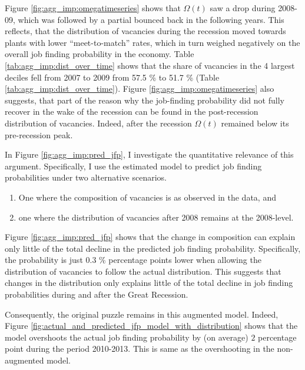 Figure \ref{fig:agg_imp:omegatimeseries} shows that $\Omega(t)$ saw a drop during 2008-09, which was followed by a partial bounced back in the following years. This reflects, that the distribution of vacancies during the recession moved towards plants with lower \enquote{meet-to-match} rates, which in turn weighed negatively on the overall job finding probability in the economy. Table \ref{tab:agg_imp:dist_over_time} shows that the share of vacancies in the 4 largest deciles fell from 2007 to 2009 from 57.5 \% to 51.7 \% (Table \ref{tab:agg_imp:dist_over_time}). Figure \ref{fig:agg_imp:omegatimeseries}  also suggests, that part of the reason why the job-finding probability did not fully recover in the wake of the recession can be found in the post-recession distribution of vacancies. Indeed, after the recession $\Omega(t)$ remained below its pre-recession peak.

In Figure \ref{fig:agg_imp:pred_jfp}, I investigate the quantitative relevance of this argument. Specifically, I use the estimated model to predict job finding probabilities under two alternative scenarios. 
\begin{enumerate}
	\item One where the composition of vacancies is as observed in the data, and
	\item one where the distribution of vacancies after 2008 remains at the 2008-level.
\end{enumerate}

Figure \ref{fig:agg_imp:pred_jfp} shows that the change in composition can explain only little of the total decline in the predicted job finding probability. Specifically, the probability is just 0.3 \% percentage points lower when allowing the distribution of vacancies to follow the actual distribution. This suggests that changes in the distribution only explains little of the total decline in job finding probabilities during and after the Great Recession. 

Consequently, the original puzzle remains in this augmented model. Indeed, Figure \ref{fig:actual_and_predicted_jfp_model_with_distribution} shows that the model overshoots the actual job finding probability by (on average) $2$ percentage point during the period 2010-2013. This is same as the overshooting in the non-augmented model.

